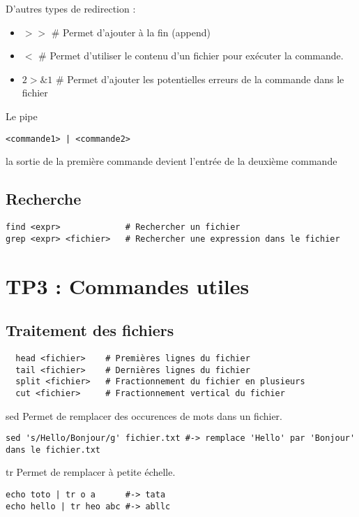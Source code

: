 \documentclass{article}
\begin{document}
D'autres types de redirection :

\begin{itemize}
  \item $>>$    \# Permet d'ajouter à la fin (append)
  \item $<$    \# Permet d'utiliser le contenu d'un fichier pour exécuter la commande.
  \item $2>\&1$ \# Permet d'ajouter les potentielles erreurs de la commande dans le fichier
\end{itemize}

Le pipe 
\begin{verbatim}
<commande1> | <commande2>
\end{verbatim}
 la sortie de la première commande devient l'entrée de la deuxième commande

\subsection{Recherche}
\begin{verbatim}
find <expr>             # Rechercher un fichier
grep <expr> <fichier>   # Rechercher une expression dans le fichier
\end{verbatim}

\section{TP3 : Commandes utiles}

\subsection{Traitement des fichiers}
\begin{verbatim}
  head <fichier>    # Premières lignes du fichier
  tail <fichier>    # Dernières lignes du fichier
  split <fichier>   # Fractionnement du fichier en plusieurs
  cut <fichier>     # Fractionnement vertical du fichier  
\end{verbatim}

sed
Permet de remplacer des occurences de mots dans un fichier.
\begin{verbatim}
sed 's/Hello/Bonjour/g' fichier.txt #-> remplace 'Hello' par 'Bonjour' dans le fichier.txt
\end{verbatim}

tr
Permet de remplacer à petite échelle.

\begin{verbatim}
echo toto | tr o a      #-> tata
echo hello | tr heo abc #-> abllc
\end{verbatim}
\end{document}
